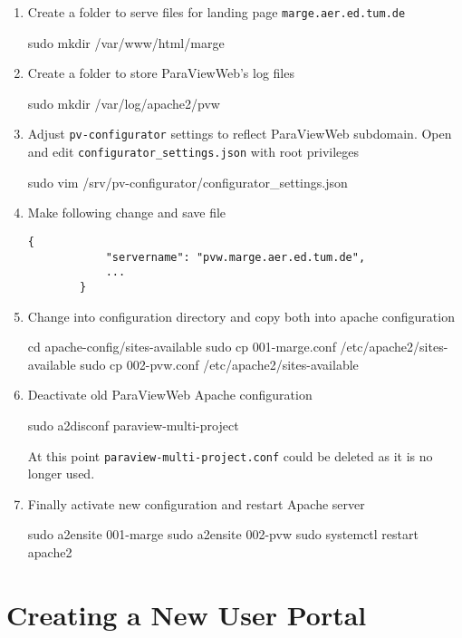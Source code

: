 \begin{enumerate}
    \item Create a folder to serve files for landing page
    \texttt{marge.aer.ed.tum.de}
    \begin{terminal}
        sudo mkdir /var/www/html/marge
    \end{terminal}
    \item Create a folder to store ParaViewWeb's log files
    \begin{terminal}
        sudo mkdir /var/log/apache2/pvw
    \end{terminal}
    \item Adjust \texttt{pv-configurator} settings to reflect ParaViewWeb
    subdomain. Open and edit \texttt{configurator\_settings.json} with root
    privileges
    \begin{terminal}
        sudo vim /srv/pv-configurator/configurator_settings.json
    \end{terminal}
    \item Make following change and save file
    \begin{lstlisting}[basicstyle=\ttfamily\small, frame=single]
        {
            "servername": "pvw.marge.aer.ed.tum.de",
            ...
        }
    \end{lstlisting}
    \item Change into configuration directory and copy both into apache
    configuration
    \begin{terminal}
        cd apache-config/sites-available
        sudo cp 001-marge.conf /etc/apache2/sites-available
        sudo cp 002-pvw.conf /etc/apache2/sites-available
    \end{terminal}
    \item Deactivate old ParaViewWeb Apache configuration
    \begin{terminal}
        sudo a2disconf paraview-multi-project
    \end{terminal}
    At this point \texttt{paraview-multi-project.conf} could be deleted as it
    is no longer used.
    \item Finally activate new configuration and restart Apache server
    \begin{terminal}
        sudo a2ensite 001-marge
        sudo a2ensite 002-pvw
        sudo systemctl restart apache2
    \end{terminal}
\end{enumerate}

\section{Creating a New User Portal}

